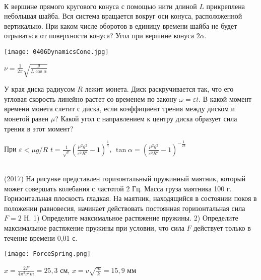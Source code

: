 \begin{ex}
\hspace{0pt} \\
\begin{minipage}{.65\textwidth}
К вершине прямого кругового конуса с помощью нити длиной $L$ прикреплена небольшая шайба. Вся система вращается вокруг оси конуса, расположенной вертикально. При каком числе оборотов в единицу времени шайба не будет отрываться от поверхности конуса? Угол при вершине конуса $2\alpha$.
\end{minipage}
\begin{minipage}{.35\textwidth}
\centering
\texttt{[image: 0406DynamicsCone.jpg]}
\end{minipage}
\begin{ans}
$\nu = \frac{1}{2\pi}\sqrt{\frac{g}{L \cos \alpha}}$
\end{ans}
\end{ex}

\begin{ex}
У края диска радиусом $R$ лежит монета. Диск раскручивается так, что его угловая скорость линейно растет со временем по закону $\omega = \varepsilon t$.  В какой момент времени монета слетит с диска, если коэффициент трения между диском и монетой равен $\mu$? Какой угол с направлением к центру диска образует сила трения в этот момент?
\begin{ans}
При $\varepsilon < \mu g /R$ $t=\frac{1}{\sqrt{\varepsilon}}\left( \frac{\mu^2 g^2}{\varepsilon^2 R^2} - 1 \right)^{\frac{1}{4}}$, $\tan \alpha = \left( \frac{\mu^2 g^2}{\varepsilon^2 R^2} - 1 \right)^{-\frac{1}{24}}$
\end{ans}
\end{ex}

\begin{ex}
\hspace{0pt} \\
(2017) На рисунке представлен горизонтальный пружинный маятник, который может совершать колебания с частотой 2 Гц. Масса груза маятника 100 г. Горизонтальная плоскость гладкая. На маятник, находящийся в состоянии покоя в положении равновесия, начинает действовать постоянная горизонтальная сила $F = 2$ Н. 1) Определите максимальное растяжение пружины. 2) Определите максимальное растяжение пружины при условии, что сила $F$ действует только в течение времени 0,01 с.
\begin{center}
\texttt{[image: ForceSpring.png]}
\end{center}
\begin{ans}
$x = \frac{2F}{4\pi^2 \nu^2 m} = 25,3$ см, $x = v\sqrt{\frac{m}{k}}=15,9$ мм
\end{ans}
\end{ex}